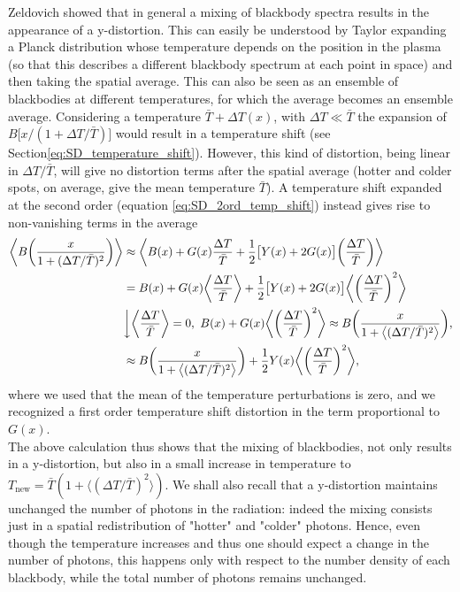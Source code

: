 Zeldovich \cite{Zeldovich1972} showed that in general a mixing of blackbody spectra results in the appearance of a y-distortion. This can easily be understood by Taylor expanding a Planck distribution whose temperature depends on the position in the plasma (so that this describes a different blackbody spectrum at each point in space) and then taking the spatial average. This can also be seen as an ensemble of blackbodies at different temperatures, for which the average becomes an ensemble average. Considering a temperature $\bar{T}+\Delta T(x)$, with $\Delta T\ll\bar{T}$ the expansion of $B\big[x/(1+\Delta T/\bar T)\big]$ would result in a temperature shift (see Section\ref{eq:SD_temperature_shift}). However, this kind of distortion, being linear in $\Delta T/\bar T$, will give no distortion terms after the spatial average (hotter and colder spots, on average, give the mean temperature $\bar T$). A temperature shift expanded at the second order (equation \eqref{eq:SD_2ord_temp_shift}) instead gives rise to non-vanishing terms in the average
\begin{align}
     \nonumber\bigg\langle B\bigg(\frac{x}{1+(\Delta T/\bar T)^2}\bigg)\bigg\rangle&\approx\bigg\langle B(x)+G(x)\frac{\Delta T}{\bar T}+\frac{1}{2}\big[Y(x)+2G(x)\big]\bigg(\frac{\Delta T}{\bar T}\bigg)\bigg\rangle\\\nonumber
     &=B(x)+G(x)\bigg\langle\frac{\Delta T}{\bar T}\bigg\rangle+\frac{1}{2}\big[Y(x)+2G(x)\big]\bigg\langle\bigg(\frac{\Delta T}{\bar T}\bigg)^2\bigg\rangle\\&\bigg\downarrow \bigg\langle\frac{\Delta T}{\bar T}\bigg\rangle=0,\ B(x)+G(x)\bigg\langle\bigg(\frac{\Delta T}{\bar T}\bigg)^2\bigg\rangle\approx B\bigg(\frac{x}{1+\big\langle(\Delta T/\bar T)^2\big\rangle}\bigg),\nonumber\\
     &\approx B\bigg(\frac{x}{1+\big\langle(\Delta T/\bar T)^2\big\rangle}\bigg)+\frac{1}{2}Y(x)\bigg\langle\bigg(\frac{\Delta T}{\bar T}\bigg)^2\bigg\rangle,\label{eq:Mixing_Y_SD}
\end{align}
where we used that the mean of the temperature perturbations is zero, and we recognized a first order temperature shift distortion in the term proportional to $G(x)$.\\ The above calculation thus shows that the mixing of blackbodies, not only results in a y-distortion, but also in a small increase in temperature to $T_{\text{new}}=\bar T(1+\langle(\Delta T/\bar T)^2\rangle)$. We shall also recall that a y-distortion maintains unchanged the number of photons in the radiation: indeed the mixing consists just in a spatial redistribution of "hotter" and "colder" photons. Hence, even though the temperature increases and thus one should expect a change in the number of photons, this happens only with respect to the number density of each blackbody, while the total number of photons remains unchanged.

